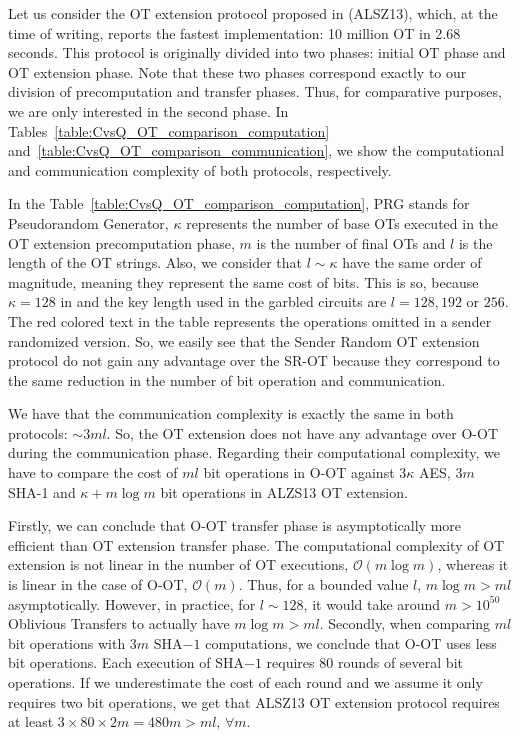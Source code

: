 Let us consider the OT extension protocol proposed in \cite{ALSZ13} (ALSZ13), which, at the time of writing, reports the fastest implementation: 10 million OT in 2.68 seconds. This protocol is originally divided into two phases: initial OT phase and OT extension phase. Note that these two phases correspond exactly to our division of precomputation and transfer phases. Thus, for comparative purposes, we are only interested in the second phase. In Tables~\ref{table:CvsQ_OT_comparison_computation} and~\ref{table:CvsQ_OT_comparison_communication}, we show the computational and communication complexity of both protocols, respectively.

In the Table~\ref{table:CvsQ_OT_comparison_computation}, PRG stands for Pseudorandom Generator, $\kappa$ represents the number of base OTs executed in the OT extension precomputation phase, $m$ is the number of final OTs and $l$ is the length of the OT strings. Also, we consider that $l \sim \kappa$ have the same order of magnitude, meaning they represent the same cost of bits. This is so, because $\kappa = 128$ in \cite{ALSZ13} and the key length used in the garbled circuits are $l = 128, 192$ or $256$. The red colored text in the table represents the operations omitted in a sender randomized version. So, we easily see that the Sender Random OT extension protocol do not gain any advantage over the SR-OT because they correspond to the same reduction in the number of bit operation and communication.

We have that the communication complexity is exactly the same in both protocols: $\sim 3ml$. So, the OT extension does not have any advantage over O-OT during the communication phase. Regarding their computational complexity, we have to compare the cost of $ml$ bit operations in O-OT against $3\kappa$ AES, $3m$ SHA-1 and $\kappa + m\log m$ bit operations in ALZS13 OT extension. 

Firstly, we can conclude that O-OT transfer phase is asymptotically more efficient than OT extension transfer phase. The computational complexity of OT extension is not linear in the number of OT executions, $\mathcal{O}(m\log m)$, whereas it is linear in the case of O-OT, $\mathcal{O}(m)$. Thus, for a bounded value $l$, $m\log m > ml$ asymptotically. However, in practice, for $l \sim 128$, it would take around $m>10^{50}$ Oblivious Transfers to actually have $m\log m > ml$. Secondly, when comparing $ml$ bit operations with $3m$ SHA$-1$ computations, we conclude that O-OT uses less bit operations. Each execution of SHA$-1$ \cite{NISTSHA} requires 80 rounds of several bit operations. If we underestimate the cost of each round and we assume it only requires two bit operations, we get that ALSZ13 OT extension protocol requires at least $3 \times 80\times 2 m = 480 m > ml, \, \forall m$. 

